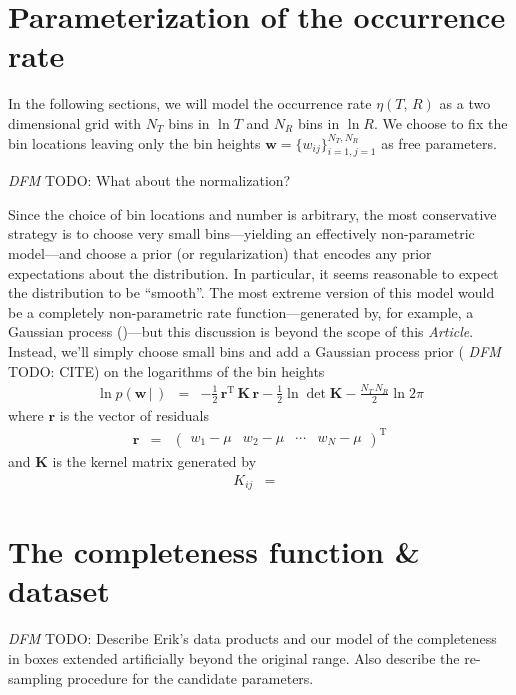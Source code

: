 \documentclass[12pt,preprint]{aastex}
\newcommand{\paper}{\emph{Article}}
\newcommand{\bvec}[1]{\ensuremath{\boldsymbol{#1}}}
\newcommand{\todo}[3]{{\color{#2} \emph{#1} TODO: #3}}
\newcommand{\dfmtodo}[1]{\todo{DFM}{red}{#1}}
\newcommand{\rate}{\ensuremath{\eta}}
\newcommand{\radius}{\ensuremath{R}}
\newcommand{\period}{\ensuremath{T}}
\newcommand{\binheight}{{\ensuremath{w}}}
\newcommand{\binheights}{{\ensuremath{\bvec{\binheight}}}}
\begin{document}
\section{Parameterization of the occurrence rate}

In the following sections, we will model the occurrence rate
$\rate(\period,\,\radius)$ as a two dimensional grid with $N_\period$ bins in
$\ln\period$ and $N_\radius$ bins in $\ln\radius$.
We choose to fix the bin locations leaving only the bin heights
$\binheights = \{\binheight_{ij}\}_{i=1,j=1}^{N_\period,N_\radius}$ as
free parameters.

\dfmtodo{What about the normalization?}

Since the choice of bin locations and number is arbitrary, the most
conservative strategy is to choose very small bins---yielding an effectively
non-parametric model---and choose a prior (or regularization) that encodes any
prior expectations about the distribution.
In particular, it seems reasonable to expect the distribution to be
``smooth''.
The most extreme version of this model would be a completely non-parametric
rate function---generated by, for example, a Gaussian process
(\citealt{poiss-gp})---but this discussion is beyond the scope of this
\paper.
Instead, we'll simply choose small bins and add a Gaussian process prior
(\dfmtodo{CITE}) on the logarithms of the bin heights
\begin{eqnarray}
\ln p(\binheights\,|\,) &=&
-\frac{1}{2}\,\bvec{r}^\mathrm{T}\,\bvec{K}\,\bvec{r}
-\frac{1}{2}\ln \det \bvec{K} - \frac{N_\period\,N_\radius}{2}\ln 2\pi
\end{eqnarray}
where $\bvec{r}$ is the vector of residuals
\begin{eqnarray}
\bvec{r} &=& \left(\begin{array}{cccc}
\binheight_1-\mu & \binheight_2-\mu & \cdots & \binheight_N-\mu
\end{array}\right)^\mathrm{T}
\end{eqnarray}
and $\bvec{K}$ is the kernel matrix generated by
\begin{eqnarray}
K_{ij} &=&
\end{eqnarray}


\section{The completeness function \& dataset}

\dfmtodo{%
Describe Erik's data products and our model of the completeness in boxes
extended artificially beyond the original range.
Also describe the re-sampling procedure for the candidate parameters.
}
\end{document}
